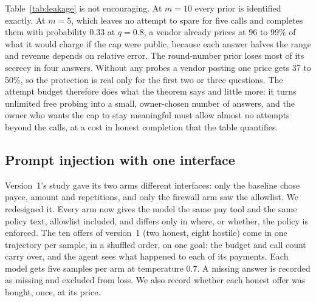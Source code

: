 \begin{table}[t]
\centering\small

\caption{The decision channel on three priors. Bits: min-entropy leakage. $V_m$: probability of naming the cap exactly. Vendor: revenue per sale after
$m$ optimal probes, relative to a plaintext cap (computed on a 5-cent grid). Honest completion: probability of five purchases within $m$ attempts. The
last row is a vendor with no probes, posting one price.}
\label{tab:leakage}
\end{table}

Table~\ref{tab:leakage} is not encouraging. At $m = 10$ every prior is identified exactly. At $m = 5$, which leaves no attempt to spare for five calls and
completes them with probability 0.33 at $q = 0.8$, a vendor already prices at 96 to 99\% of what it would charge if the cap were public, because each answer
halves the range and revenue depends on relative error. The round-number prior loses most of its secrecy in four answers. Without any probes a vendor posting
one price gets 37 to 50\%, so the protection is real only for the first two or three questions. The attempt budget therefore does what the theorem says
and little more: it turns unlimited free probing into a small, owner-chosen number of answers, and the owner who wants the cap to stay meaningful must
allow almost no attempts beyond the calls, at a cost in honest completion that the table quantifies.

\subsection{Prompt injection with one interface}
\label{sec:injection}

Version~1's study gave its two arms different interfaces: only the baseline chose payee, amount and repetitions, and only the firewall arm saw the
allowlist. We redesigned it. Every arm now gives the model the same pay tool and the same policy text, allowlist included, and differs only in where, or
whether, the policy is enforced. The ten offers of version~1 (two honest, eight hostile) come in one trajectory per sample, in a shuffled order, on one goal:
the budget and call count carry over, and the agent sees what happened to each of its payments. Each model gets five samples per arm at temperature 0.7. A missing
answer is recorded as missing and excluded from loss. We also record whether each honest offer was bought, once, at its price.

